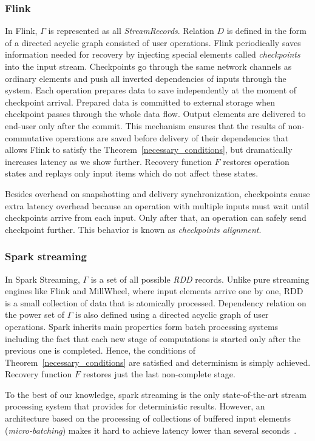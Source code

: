 \subsubsection{Flink}

In Flink, $\Gamma$ is represented as all {\em StreamRecords}. Relation $D$ is defined in the form of a directed acyclic graph consisted of user operations. Flink periodically saves information needed for recovery by injecting special elements called {\em checkpoints} into the input stream. Checkpoints go through the same network channels as ordinary elements and push all inverted dependencies of inputs through the system. Each operation prepares data to save independently at the moment of checkpoint arrival. Prepared data is committed to external storage when checkpoint passes through the whole data flow. Output elements are delivered to end-user only after the commit. This mechanism ensures that the results of non-commutative operations are saved before delivery of their dependencies that allows Flink to satisfy the Theorem~\ref{necessary_conditions}, but dramatically increases latency as we show further. Recovery function $F$ restores operation states and replays only input items which do not affect these states.

Besides overhead on snapshotting and delivery synchronization, checkpoints cause extra latency overhead because an operation with multiple inputs must wait until checkpoints arrive from each input. Only after that, an operation can safely send checkpoint further. This behavior is known as {\em checkpoints alignment}.

\subsubsection{Spark streaming}

In Spark Streaming, $\Gamma$ is a set of all possible {\em RDD} records. Unlike pure streaming engines like Flink and MillWheel, where input elements arrive one by one, RDD is a small collection of data that is atomically processed. Dependency relation on the power set of $\Gamma$ is also defined using a directed acyclic graph of user operations. Spark inherits main properties form batch processing systems including the fact that each new stage of computations is started only after the previous one is completed. Hence, the conditions of Theorem~\ref{necessary_conditions} are satisfied and determinism is simply achieved. Recovery function $F$ restores just the last non-complete stage.
 
To the best of our knowledge, spark streaming is the only state-of-the-art stream processing system that provides for deterministic results. However, an architecture based on the processing of collections of buffered input elements ({\em micro-batching}) makes it hard to achieve latency lower than several seconds~\cite{7530084, 7474816}. 
